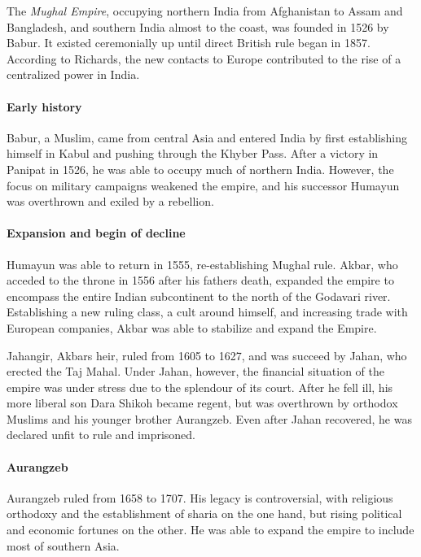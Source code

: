 \documentclass[11pt, a4paper, headings=standardclasses]{scrartcl}
\begin{document}
The \emph{Mughal Empire}, occupying northern India from Afghanistan to Assam and Bangladesh, and southern India almost to the coast, was founded in 1526 by Babur. It existed ceremonially up until direct British rule began in 1857.
According to Richards, the new contacts to Europe contributed to the rise of a centralized power in India.\autocite[6]{richards}
\paragraph{Early history}

Babur, a Muslim, came from central Asia and entered India by first establishing himself in Kabul and pushing through the Khyber Pass.
 After a victory in Panipat in 1526, he was able to occupy much of northern India. However, the focus on military campaigns weakened the empire, and his successor Humayun was overthrown and exiled by a rebellion.\autocite[Chapter 1]{richards}

\paragraph{Expansion and begin of decline}

Humayun was able to return in 1555, re-establishing Mughal rule.\autocite[12]{richards} Akbar, who acceded to the throne in 1556 after his fathers death, expanded the empire to encompass the entire Indian subcontinent to the north of the Godavari river. Establishing a new ruling class, a cult around himself, and increasing trade with European companies, Akbar was able to stabilize and expand the Empire.\autocite[16]{richards}

Jahangir, Akbars heir, ruled from 1605 to 1627, and was succeed by Jahan, who erected the Taj Mahal. Under Jahan, however, the financial situation of the empire was under stress due to the splendour of its court.\autocite[Chapter 6]{richards} After he fell ill, his more liberal son Dara Shikoh became regent, but was overthrown by orthodox Muslims and his younger brother Aurangzeb. Even after Jahan recovered, he was declared unfit to rule and imprisoned.\autocite[Chapter 7]{richards}

\paragraph{Aurangzeb}

Aurangzeb ruled from 1658 to 1707\autocite[165]{richards}. His legacy is controversial, with religious orthodoxy and the establishment of sharia on the one hand, but rising political and economic fortunes on the other. He was able to expand the empire to include most of southern Asia.\autocite[Chapter 8]{richards}
\end{document}
